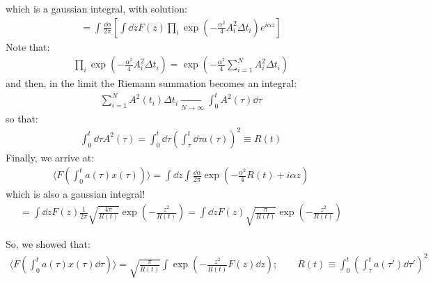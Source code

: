 \documentclass[../template.tex]{subfiles}
\begin{document}
which is a gaussian integral, with solution:
\begin{align*}
    = \int \frac{\dd{\alpha}}{2 \pi} \left[\int \dd{z} F(z) \prod_i \exp\left(-\frac{\alpha^2}{4} A_i^2 \Delta t_i \right) e^{i \alpha z}\right] 
\end{align*}
Note that:
\begin{align*}
    \prod_i \exp\left(-\frac{\alpha^2}{4} A_i^2 \Delta t_i \right) =
    \exp\left(-\frac{\alpha^2}{4} \sum_{i=1}^N A_i^2 \Delta t_i \right)
\end{align*}
and then, in the limit the Riemann summation becomes an integral:
\begin{align*}
    \sum_{i=1}^N A^2(t_i) \Delta t_i  \xrightarrow[N \to \infty]{}  \int_0^t A^2(\tau) \dd{\tau}
\end{align*}
so that:
\begin{align*}
    \int_0^t \dd{\tau} A^2(\tau) = \int_0^t \dd{\tau} \left(\int_{\tau}^t \dd{\tau} a(\tau)\right)^2 \equiv R(t)
\end{align*}
Finally, we arrive at:
\begin{align*}
    \langle F\left(\int_{0}^t a(\tau )x(\tau)\right) \rangle = \int \dd{z} \int \frac{\dd{\alpha}}{2 \pi} \exp\left(-\frac{\alpha^2}{4} R(t) + i \alpha z \right) 
\end{align*}
which is also a gaussian integral!
\begin{align*}
    = \int \dd{z} F(z) \frac{1}{2 \pi} \sqrt{\frac{4 \pi}{R(t)} } \exp\left(-\frac{z^2}{R(t)} \right) = \int \dd{z} F(z) \sqrt{\frac{\pi}{R(t)} } \exp\left(-\frac{z^2}{R(t)} \right)  
\end{align*}

So, we showed that:
\begin{align*}
    \langle F\left(\int_0^t a(\tau) x(\tau)\dd{\tau}\right) \rangle = \sqrt{\frac{\pi}{R(t)} } \int \exp\left(-\frac{z^2}{R(t)} F(z) \dd{z}\right); \qquad R(t) \equiv \int_0^t \left(\int_\tau^t a(\tau') \dd{\tau'}\right)^2
\end{align*}
\end{document}
